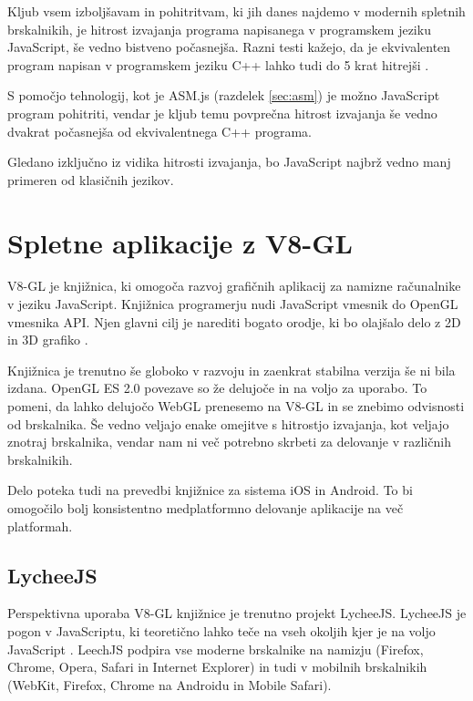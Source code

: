 Kljub vsem izboljšavam in pohitritvam, ki jih danes najdemo v modernih spletnih brskalnikih, je hitrost izvajanja programa napisanega v programskem jeziku JavaScript, še vedno bistveno počasnejša. Razni testi kažejo, da je ekvivalenten program napisan v programskem jeziku C++ lahko tudi do 5 krat hitrejši \cite{jsperformance}.

S pomočjo tehnologij, kot je ASM.js (razdelek \ref{sec:asm}) je možno JavaScript program pohitriti, vendar je kljub temu povprečna hitrost izvajanja še vedno dvakrat počasnejša od ekvivalentnega C++ programa.

Gledano izključno iz vidika hitrosti izvajanja, bo JavaScript najbrž vedno manj primeren od klasičnih jezikov.

\section{Spletne aplikacije z V8-GL}

V8-GL je knjižnica, ki omogoča razvoj grafičnih aplikacij za namizne računalnike v jeziku JavaScript. Knjižnica programerju nudi JavaScript vmesnik do OpenGL vmesnika API. Njen glavni cilj je narediti bogato orodje, ki bo olajšalo delo z 2D in 3D grafiko \cite{v8gl}.

Knjižnica je trenutno še globoko v razvoju in zaenkrat stabilna verzija še ni bila izdana. OpenGL ES 2.0 povezave so že delujoče in na voljo za uporabo. To pomeni, da lahko delujočo WebGL prenesemo na V8-GL in se znebimo odvisnosti od brskalnika. Še vedno veljajo enake omejitve s hitrostjo izvajanja, kot veljajo znotraj brskalnika, vendar nam ni več potrebno skrbeti za delovanje v različnih brskalnikih.

Delo poteka tudi na prevedbi knjižnice za sistema iOS in Android. To bi omogočilo bolj konsistentno medplatformno delovanje aplikacije na več platformah.

\subsection{LycheeJS}

Perspektivna uporaba V8-GL knjižnice je trenutno projekt LycheeJS. LycheeJS je pogon v JavaScriptu, ki teoretično lahko teče na vseh okoljih kjer je na voljo JavaScript  \cite{lycheejs}. LeechJS podpira vse moderne brskalnike na namizju (Firefox, Chrome, Opera, Safari in Internet Explorer) in tudi v mobilnih brskalnikih (WebKit, Firefox, Chrome na Androidu in Mobile Safari). 

